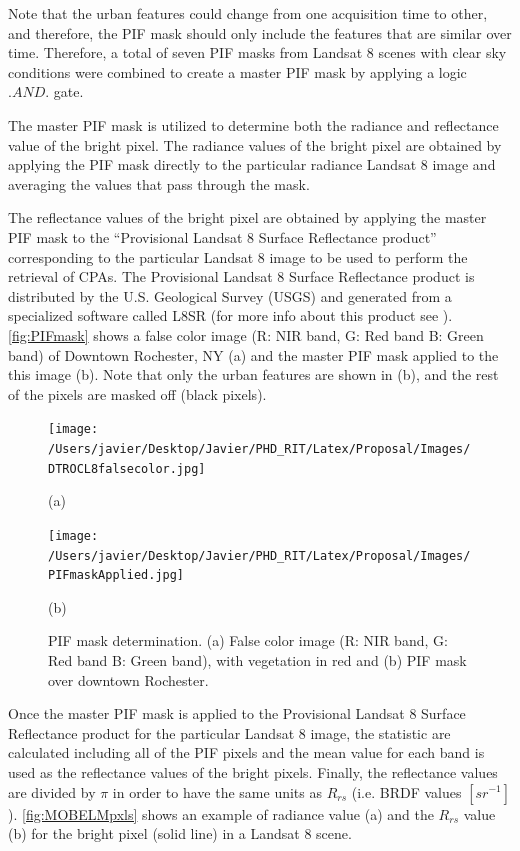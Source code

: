 \documentclass[onecolumn,3p,letterpaper]{elsarticle}
\begin{document}
Note that the urban features could change from one acquisition time to other, and therefore, the PIF mask should only include the features that are similar over time. Therefore, a total of seven PIF masks from Landsat 8 scenes with clear sky conditions were combined to create a master PIF mask by applying a logic $.AND.$ gate.

The master PIF mask is utilized to determine both the radiance and reflectance value of the bright pixel. The radiance values of the bright pixel are obtained by applying the PIF mask directly to the particular radiance Landsat 8 image and averaging the values that pass through the mask.

The reflectance values of the bright pixel are obtained by applying the master PIF mask to the ``Provisional Landsat 8 Surface Reflectance product'' corresponding to the particular Landsat 8 image to be used to perform the retrieval of CPAs. The Provisional Landsat 8 Surface Reflectance product is distributed by the U.S. Geological Survey (USGS) and generated from a specialized software called L8SR (for more info about this product see \cite{L8SurfProduct2015}). \autoref{fig:PIFmask} shows a false color image (R: NIR  band, G: Red band B: Green band) of Downtown Rochester, NY (a) and the master PIF mask applied to the this image (b). Note that only the urban features are shown in (b), and the rest of the pixels are masked off (black pixels).

\begin{figure}[htb]
  \begin{minipage}[c]{0.48\linewidth}
    \centering
      \texttt{[image: /Users/javier/Desktop/Javier/PHD\_RIT/Latex/Proposal/Images/DTROCL8falsecolor.jpg]}
    \centerline{(a)}\medskip
  \end{minipage}
  \hfill
  \begin{minipage}[d]{0.48\linewidth}
    \centering
      \texttt{[image: /Users/javier/Desktop/Javier/PHD\_RIT/Latex/Proposal/Images/PIFmaskApplied.jpg]}
    \centerline{(b)}\medskip
  \end{minipage}
  \caption{PIF mask determination. (a) False color image (R: NIR band, G: Red band B: Green band), with vegetation in red and (b) PIF mask over downtown Rochester. \label{fig:PIFmask} } 
\end{figure}

Once the master PIF mask is applied to the Provisional Landsat 8 Surface Reflectance product for the particular Landsat 8 image, the statistic are calculated including all of the PIF pixels and the mean value for each band is used as the reflectance values of the bright pixels. Finally, the reflectance values are divided by $\pi$ in order to have the same units as $R_{rs}$ (i.e. BRDF values $[sr^{-1}]$). \autoref{fig:MOBELMpxls} shows an example of radiance value (a) and the $R_{rs}$ value (b) for the bright pixel (solid line) in a Landsat 8 scene.
\end{document}
